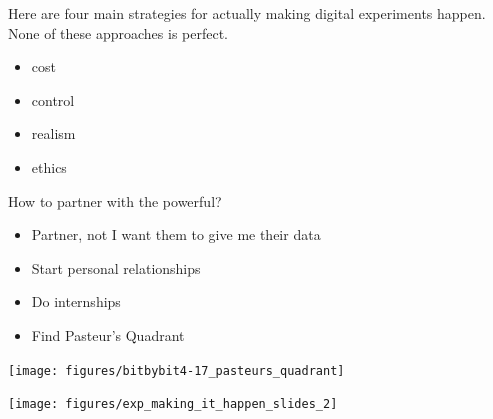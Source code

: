 \documentclass[aspectratio=169]{beamer}
\begin{document}
\begin{frame}

Here are four main strategies for actually making digital experiments happen.  None of these approaches is perfect.
\begin{itemize}
\item cost
\pause
\item control
\pause
\item realism
\pause
\item ethics
\end{itemize}

\end{frame}
\begin{frame}

\begin{center}
\end{center}

\end{frame}
\begin{frame}

How to partner with the powerful?

\end{frame}
\begin{frame}

\begin{itemize}
\item Partner, not I want them to give me their data
\pause
\item Start personal relationships
\pause
\item Do internships
\pause
\item Find Pasteur's Quadrant
\end{itemize}

\end{frame}
\begin{frame}

\begin{center}
\texttt{[image: figures/bitbybit4-17\_pasteurs\_quadrant]}
\end{center}

\end{frame}
\begin{frame}

\begin{center}
\texttt{[image: figures/exp\_making\_it\_happen\_slides\_2]}
\end{center}

\end{frame}
\end{document}
